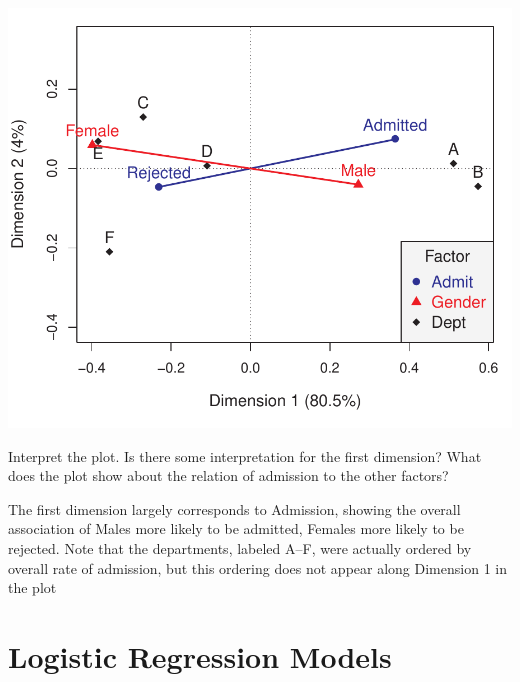 \documentclass[10pt]{report}\usepackage[]{graphicx}\usepackage[]{color}
\newenvironment{knitrout}{}{} %
\renewenvironment{knitrout}{\small\renewcommand{\baselinestretch}{.85}}{} %
\begin{document}
\begin{Exercises}
\begin{enumerate*}
\begin{ans}
\begin{knitrout}
\centerline{\includegraphics[width=.5\textwidth]{soln/fig/ex6_13b-1} }



\end{knitrout}
    \end{ans}
    
    \item Interpret the plot.  Is there some interpretation for the first dimension?
    What does the plot show about the relation of admission to the other factors?
    \begin{ans}
    The first dimension largely corresponds to Admission, showing the overall association
    of Males more likely to be admitted, Females more likely to be rejected.
    Note that the departments, labeled A--F, were actually ordered by overall
    rate of admission, but this ordering does not appear along Dimension 1
    in the plot
    \end{ans}
    
  \end{enumerate*}

\end{Exercises}


\clearpage
\chapter{Logistic Regression Models}\label{ch:logistic}
\end{document}
